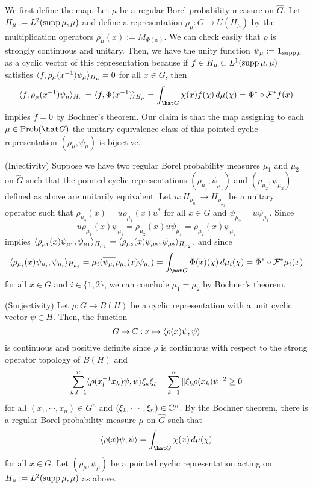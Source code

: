 \documentclass[a4paper]{article}
\begin{document}
\begin{pf}
We first define the map.
Let $\mu$ be a regular Borel probability measure on $\hat G$.
Let $H_\mu:=L^2(\operatorname{supp}\mu,\mu)$ and define a representation $\rho_\mu:G\to U(H_\mu)$ by the multiplication operators $\rho_\mu(x):=M_{\Phi(x)}$.
We can check easily that $\rho$ is strongly continuous and unitary.
Then, we have the unity function $\psi_\mu:=\mathbf{1}_{\operatorname{supp}\mu}$ as a cyclic vector of this representation because if $f\in H_\mu\subset L^1(\operatorname{supp}\mu,\mu)$ satisfies $\langle f,\rho_\mu(x^{-1})\psi_\mu\rangle_{H_\mu}=0$ for all $x\in G$, then
\[\<f,\rho_\mu(x^{-1})\psi_\mu\>_{H_\mu}=\<f,\Phi(x^{-1})\>_{H_\mu}=\int_{\hat G}\chi(x)f(\chi)\,d\mu(\chi)=\Phi^*\circ\cF^*f(x)\]
implies $f=0$ by Bochner's theorem.
Our claim is that the map assigning to each $\mu\in\Prob(\hat G)$ the unitary equivalence class of this pointed cyclic representation $(\rho_\mu,\psi_\mu)$ is bijective.

(Injectivity)
Suppose we have two regular Borel probability measures $\mu_1$ and $\mu_2$ on $\hat G$ such that the pointed cyclic representations $(\rho_{\mu_1},\psi_{\mu_1})$ and $(\rho_{\mu_2},\psi_{\mu_2})$ defined as above are unitarily equivalent.
Let $u:H_{\rho_{\mu_1}}\to H_{\rho_{\mu_2}}$ be a unitary operator such that $\rho_{\mu_2}(x)=u\rho_{\mu_1}(x)u^*$ for all $x\in G$ and $\psi_{\mu_2}=u\psi_{\mu_1}$.
Since
\[u\rho_{\mu_1}(x)\psi_{\mu_1}=\rho_{\mu_2}(x)u\psi_{\mu_1}=\rho_{\mu_2}(x)\psi_{\mu_2}\]
implies $\langle\rho_{\mu_1}(x)\psi_{\mu_1},\psi_{\mu_1}\rangle_{H_{\mu_1}}=\langle\rho_{\mu_2}(x)\psi_{\mu_2},\psi_{\mu_2}\rangle_{H_{\mu_2}}$, and since
\[\<\rho_{\mu_i}(x)\psi_{\mu_i},\psi_{\mu_i}\>_{H_{\mu_i}}=\mu_i(\bar{\psi_{\mu_i}}\rho_{\mu_i}(x)\psi_{\mu_i})=\int_{\hat G}\Phi(x)(\chi)\,d\mu_i(\chi)=\Phi^*\circ\cF^*\mu_i(x)\]
for all $x\in G$ and $i\in\{1,2\}$, we can conclude $\mu_1=\mu_2$ by Bochner's theorem.

(Surjectivity)
Let $\rho:G\to B(H)$ be a cyclic representation with a unit cyclic vector $\psi\in H$.
Then, the function
\[G\to\mathbb{C}:x\mapsto\langle\rho(x)\psi,\psi\rangle\]
is continuous and positive definite since $\rho$ is continuous with respect to the strong operator topology of $B(H)$ and
\[\sum_{k,l=1}^n\langle\rho(x_l^{-1}x_k)\psi,\psi\rangle\xi_k\overline\xi_l=\sum_{k=1}^n\|\xi_k\rho(x_k)\psi\|^2\ge0\]
for all $(x_1,\cdots,x_n)\in G^n$ and $(\xi_1,\cdots,\xi_n)\in\mathbb{C}^n$.
By the Bochner theorem, there is a regular Borel probability measure $\mu$ on $\hat G$ such that
\[\<\rho(x)\psi,\psi\>=\int_{\hat G}\chi(x)\,d\mu(\chi)\]
for all $x\in G$.
Let $(\rho_\mu,\psi_\mu)$ be a pointed cyclic representation acting on $H_\mu:=L^2(\operatorname{supp}\mu,\mu)$ as above.


\end{pf}
\end{document}
